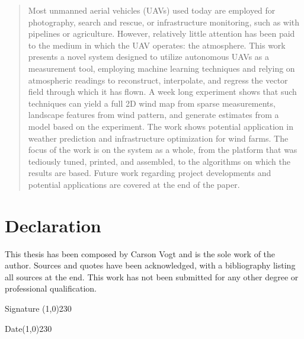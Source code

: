\documentclass[12pt]{report}
\begin{document}
\maketitle

\begin{abstract}
\begin{small}
Most unmanned aerial vehicles (UAVs) used today are employed for photography, search and rescue, or infrastructure monitoring, such as with pipelines or agriculture. However, relatively little attention has been paid to the medium in which the UAV operates: the atmosphere.
This work presents a novel system designed to utilize autonomous UAVs as a measurement tool, employing machine learning techniques and relying on atmospheric readings to reconstruct, interpolate, and regress the vector field through which it has flown. A week long experiment shows that such techniques can yield a full 2D wind map from sparse measurements, landscape features from wind pattern, and generate estimates from a model based on the experiment. The work shows potential application in weather prediction and infrastructure optimization for wind farms. The focus of the work is on the system as a whole, from the platform that was tediously tuned, printed, and assembled, to the algorithms on which the results are based. Future work regarding project developments and potential applications are covered at the end of the paper.
\end{small}
\end{abstract}

\chapter*{Declaration}
\vspace{3cm}
This thesis has been composed by Carson Vogt and is the sole work of the author. Sources and quotes have been acknowledged, with a bibliography listing all sources at the end. This work has not been submitted for any other degree or professional qualification.

\vspace{5cm}

Signature\hspace{2cm} \line(1,0){230}

\vspace{2cm}

Date\hspace{3cm}\line(1,0){230}

\listoffigures
\end{document}
